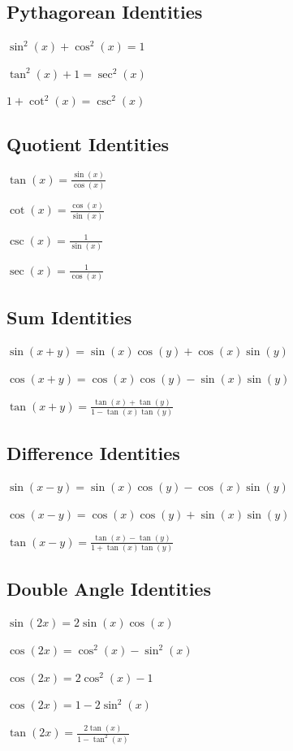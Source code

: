 \subsection*{Pythagorean Identities}	
\begin{eqlist}
	\item $\sin^2(x) + \cos^2(x) = 1$
	\item $\tan^2(x) + 1 = \sec^2(x)$
	\item $1 + \cot^2(x) = \csc^2(x)$
\end{eqlist}


\subsection*{Quotient Identities}	
\begin{eqlist}
	\item $\tan(x) = \frac{\sin(x)}{\cos(x)}$
	\item $\cot(x) = \frac{\cos(x)}{\sin(x)}$
        \item $\csc(x) = \frac{1}{\sin(x)}$
        \item $\sec(x) = \frac{1}{\cos(x)}$
\end{eqlist}

\subsection*{Sum Identities}	
\begin{eqlist}
	\item $\sin(x + y) = \sin(x)\cos(y) + \cos(x)\sin(y)$
	\item $\cos(x + y) = \cos(x)\cos(y) - \sin(x)\sin(y)$
	\item $\tan(x + y) = \frac{\tan(x) + \tan(y)}{1-\tan(x)\tan(y)}$
\end{eqlist}

\subsection*{Difference Identities}	
\begin{eqlist}
	\item $\sin(x - y) = \sin(x)\cos(y) - \cos(x)\sin(y)$
	\item $\cos(x - y) = \cos(x)\cos(y) + \sin(x)\sin(y)$
	\item $\tan(x - y) = \frac{\tan(x) - \tan(y)}{1 + \tan(x)\tan(y)}$
\end{eqlist}

\subsection*{Double Angle Identities}	
\begin{eqlist}
	\item $\sin(2x) = 2\sin(x)\cos(x)$
	\item $\cos(2x) = \cos^2(x) - \sin^2(x) $
	\item $\cos(2x) = 2\cos^2(x) - 1$
	\item $\cos(2x) = 1 - 2\sin^2(x)$
	\item $\tan(2x) = \frac{2\tan(x)}{1-\tan^2(x)} $
\end{eqlist}

